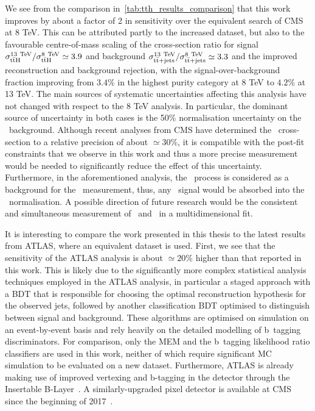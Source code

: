 We see from the comparison in~\cref{tab:tth_results_comparison} that this work improves by about a factor of 2 in sensitivity over the equivalent search of CMS at 8 TeV. This can be attributed partly to the increased dataset, but also to the favourable centre-of-mass scaling of the cross-section ratio for signal $\sigma_{\mathrm{t} \bar{\mathrm{t}} \mathrm{H}}^{13~\mathrm{TeV}}/\sigma_{\mathrm{t} \bar{\mathrm{t}} \mathrm{H}}^{8~\mathrm{TeV}} \simeq 3.9$ and background $\sigma_{\mathrm{t} \bar{\mathrm{t}}+\mathrm{jets}}^{13~\mathrm{TeV}}/\sigma_{\mathrm{t} \bar{\mathrm{t}}+\mathrm{jets}}^{8~\mathrm{TeV}} \simeq 3.3$ and the improved reconstruction and background rejection, with the signal-over-background fraction improving from $3.4\%$ in the highest purity category at 8 TeV to $4.2\%$ at 13 TeV. The main sources of systematic uncertainties affecting this analysis have not changed with respect to the 8 TeV analysis. In particular, the dominant source of uncertainty in both cases is the 50\% normalisation uncertainty on the \ttbb~background. Although recent analyses from CMS have determined the \ttbb~cross-section to a relative precision of about $\simeq30\%$, it is compatible with the post-fit constraints that we observe in this work and thus a more precise measurement would be needed to significantly reduce the effect of this uncertainty. Furthermore, in the aforementioned analysis, the \ttHbb~process is considered as a background for the \ttbb~measurement, thus, any \ttHbb~signal would be absorbed into the \ttbb~normalisation. A possible direction of future research would be the consistent and simultaneous measurement of \ttHbb~and \ttbb~in a multidimensional fit.

It is interesting to compare the work presented in this thesis to the latest results from ATLAS, where an equivalent dataset is used. First, we see that the sensitivity of the ATLAS analysis is about $\simeq20\%$ higher than that reported in this work. This is likely due to the significantly more complex statistical analysis techniques employed in the ATLAS analysis, in particular a staged approach with a BDT that is responsible for choosing the optimal reconstruction hypothesis for the observed jets, followed by another classification BDT optimised to distinguish between signal and background. These algorithms are optimised on simulation on an event-by-event basis and rely heavily on the detailed modelling of b~tagging discriminators. For comparison, only the MEM and the b~tagging likelihood ratio classifiers are used in this work, neither of which require significant MC simulation to be evaluated on a new dataset. Furthermore, ATLAS is already making use of improved vertexing and b-tagging in the detector through the Insertable B-Layer~\cite{Capeans:1291633}. A similarly-upgraded pixel detector is available at CMS since the beginning of 2017~\cite{CMS:2012sda}.

